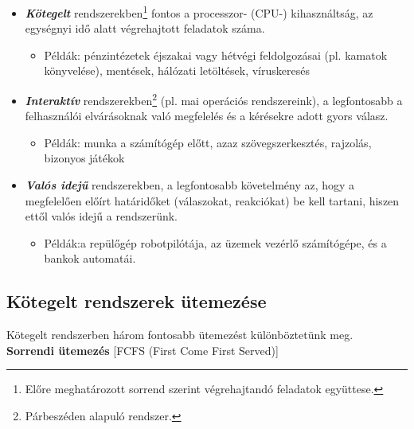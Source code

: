 \documentclass[tikz,12pt,margin=0px]{article}
\begin{document}
    \begin{itemize}[topsep=8pt,itemsep=4pt,partopsep=4pt, parsep=4pt]
        \item \emph{\textbf{Kötegelt}} rendszerekben\footnote{Előre meghatározott sorrend szerint végrehajtandó feladatok együttese.} fontos a processzor- (CPU-) kihasználtság, az egységnyi idő alatt végrehajtott feladatok száma.
        \begin{itemize}
            \small
            \item Példák: pénzintézetek éjszakai vagy hétvégi feldolgozásai (pl. kamatok könyvelése), mentések, hálózati letöltések, víruskeresés
        \end{itemize}
        \item \emph{\textbf{Interaktív}} rendszerekben\footnote{Párbeszéden alapuló rendszer.} (pl. mai operációs rendszereink), a legfontosabb a felhasználói elvárásoknak való megfelelés és a kérésekre adott gyors válasz.
            \begin{itemize}
                \small
                \item Példák: munka a számítógép előtt, azaz szövegszerkesztés, rajzolás, bizonyos játékok
            \end{itemize}

        \item \emph{\textbf{Valós idejű}} rendszerekben, a legfontosabb követelmény az, hogy a megfelelően előírt határidőket (válaszokat, reakciókat) be kell tartani, hiszen ettől valós idejű a rendszerünk.
            \begin{itemize}
                \small
                \item  Példák:a repülőgép robotpilótája, az üzemek vezérlő számítógépe, és a bankok automatái.
            \end{itemize}

    \end{itemize}

    \subsection*{Kötegelt rendszerek ütemezése}

    \noindent Kötegelt rendszerben három fontosabb ütemezést különböztetünk meg.\\

    \noindent \textbf{Sorrendi ütemezés} [FCFS (First Come First Served)]
\end{document}
